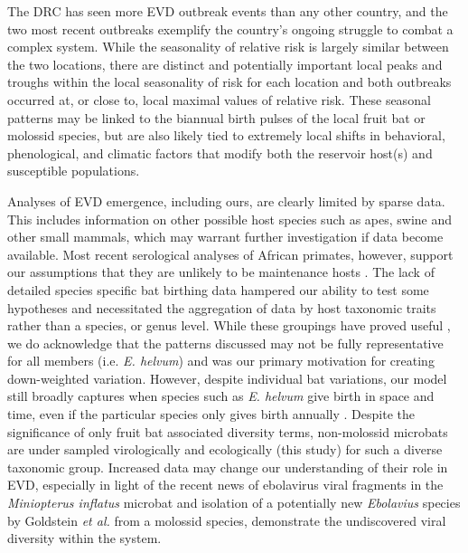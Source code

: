 \documentclass[a4paper,twoside, onecolumn]{article}
\begin{document}
	The DRC has seen more EVD outbreak events than any other country, and the two most recent outbreaks exemplify the country's ongoing struggle to combat a complex system. While the seasonality of relative risk is largely similar between the two locations, there are distinct and potentially important local peaks and troughs within the local seasonality of risk for each location and both outbreaks occurred at, or close to, local maximal values of relative risk. These seasonal patterns may be linked to the biannual birth pulses of the local fruit bat or molossid species, but are also likely tied to extremely local shifts in behavioral, phenological, and climatic factors that modify both the reservoir host(s) and susceptible populations.\par
	Analyses of EVD emergence, including ours, are clearly limited by sparse data. This includes information on other possible host species such as apes, swine and other small mammals, which may warrant further investigation if data become available. Most recent serological analyses of African primates, however, support our assumptions that they are unlikely to be maintenance hosts \cite{ayouba2019,hayman2019}. The lack of detailed species specific bat birthing data hampered our ability to test some hypotheses and necessitated the aggregation of data by host taxonomic traits rather than a species, or genus level. While these groupings have proved useful \cite{Cumming1997}, we do acknowledge that the patterns discussed may not be fully representative for all members (i.e. \textit{E. helvum}) and was our primary motivation for creating down-weighted variation. However, despite individual bat variations, our model still broadly captures when species such as \textit{E. helvum} give birth in space and time, even if the particular species only gives birth annually \cite{Peel2017}. Despite the significance of only fruit bat associated diversity terms, non-molossid microbats are under sampled virologically \cite{Leendertz2016} and ecologically (this study) for such a diverse taxonomic group. Increased data may change our understanding of their role in EVD, especially in light of the recent news of ebolavirus viral fragments in the \textit{Miniopterus inflatus} microbat and isolation of a potentially new \textit{Ebolavius} species by Goldstein \textit{et al.} \cite{Goldstein2018} from a molossid species, demonstrate the undiscovered viral diversity within the system. 
\end{document}
